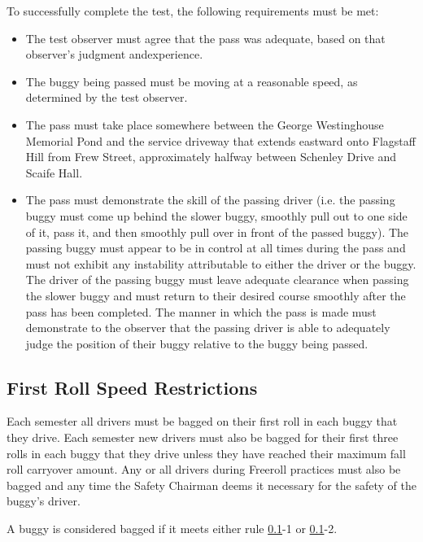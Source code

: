 	\noindent To successfully complete the test, the following requirements must be met:

	\begin{itemize}

		\item The test observer must agree that the pass was adequate, based on that observer's judgment andexperience.

		\item The buggy being passed must be moving at a reasonable speed, as determined by the test observer.

		\item The pass must take place somewhere between the George Westinghouse Memorial Pond and the service driveway that extends eastward onto Flagstaff Hill from Frew Street, approximately halfway between Schenley Drive and Scaife Hall.

		\item The pass must demonstrate the skill of the passing driver (i.e. the passing buggy must come up behind the slower buggy, smoothly pull out to one side of it, pass it, and then smoothly pull over in front of the passed buggy). The passing buggy must appear to be in control at all times during the pass and must not exhibit any instability attributable to either the driver or the buggy. The driver of the passing buggy must leave adequate clearance when passing the slower buggy and must return to their desired course smoothly after the pass has been completed. The manner in which the pass is made must demonstrate to the observer that the passing driver is able to adequately judge the position of their buggy relative to the buggy being passed.

	\end{itemize}

\subsection{First Roll Speed Restrictions}
\label{sec:FirstRollSpeedRestrictions}

	Each semester all drivers must be bagged on their first roll in each buggy that they drive. Each semester new drivers must also be bagged for their first three rolls in each buggy that they drive unless they have reached their maximum fall roll carryover amount. Any or all drivers during Freeroll practices must also be bagged and any time the Safety Chairman deems it necessary for the safety of the buggy's driver.

	A buggy is considered bagged if it meets either rule
	\ref{sec:FirstRollSpeedRestrictions}-1 or \ref{sec:FirstRollSpeedRestrictions}-2.

